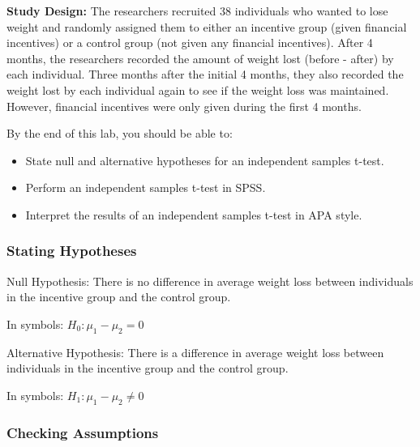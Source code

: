\documentclass[
  letterpaper,
  DIV=11,
  numbers=noendperiod]{scrartcl}
\providecommand{\tightlist}{%
  \setlength{\itemsep}{0pt}\setlength{\parskip}{0pt}}\usepackage{longtable,booktabs,array}
\begin{document}
\textbf{Study Design:} The researchers recruited 38 individuals who
wanted to lose weight and randomly assigned them to either an incentive
group (given financial incentives) or a control group (not given any
financial incentives). After 4 months, the researchers recorded the
amount of weight lost (before - after) by each individual. Three months
after the initial 4 months, they also recorded the weight lost by each
individual again to see if the weight loss was maintained. However,
financial incentives were only given during the first 4 months.

\begin{tcolorbox}[enhanced jigsaw, opacityback=0, colbacktitle=quarto-callout-note-color!10!white, colframe=quarto-callout-note-color-frame, leftrule=.75mm, bottomtitle=1mm, titlerule=0mm, title=\textcolor{quarto-callout-note-color}{\faInfo}\hspace{0.5em}{Learning Objectives}, opacitybacktitle=0.6, toptitle=1mm, colback=white, bottomrule=.15mm, rightrule=.15mm, breakable, arc=.35mm, toprule=.15mm, left=2mm, coltitle=black]

By the end of this lab, you should be able to:

\begin{itemize}
\tightlist
\item
  State null and alternative hypotheses for an independent samples
  t-test.
\item
  Perform an independent samples t-test in SPSS.
\item
  Interpret the results of an independent samples t-test in APA style.
\end{itemize}

\end{tcolorbox}

\subsubsection{Stating Hypotheses}\label{stating-hypotheses}

Null Hypothesis: There is no difference in average weight loss between
individuals in the incentive group and the control group.

In symbols: \(H_0: \mu_1-\mu_2 = 0\)

Alternative Hypothesis: There is a difference in average weight loss
between individuals in the incentive group and the control group.

In symbols: \(H_1: \mu_1-\mu_2 \neq 0\)

\subsubsection{Checking Assumptions}\label{checking-assumptions}
\end{document}
